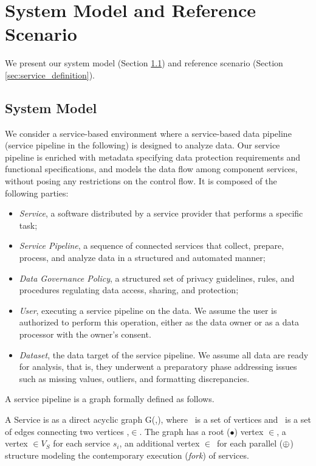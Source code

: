 \section{System Model and Reference Scenario}\label{sec:requirements}
We present our system model (Section \ref{sec:systemmodel}) and reference scenario (Section \ref{sec:service_definition}).

\subsection{System Model}\label{sec:systemmodel}
{\color{OurColor} We consider a service-based environment where a service-based data pipeline (service pipeline in the following) is designed to analyze data. Our service pipeline is enriched with metadata specifying data protection requirements and functional specifications, and models the data flow among component services, without posing any restrictions on the control flow.} It is composed of the following parties:
\begin{itemize}
  \item \emph{Service}, a software distributed by a service provider that performs a specific task;
  \item \emph{Service Pipeline}, a sequence of connected services that collect, prepare, process, and analyze data in a structured and automated manner;
  \item \emph{Data Governance Policy}, a structured set of privacy guidelines, rules, and procedures regulating data access, sharing, and protection;
  \item \emph{User}, executing a service pipeline on the data. We assume the user is authorized to perform this operation, either as the data owner or as a data processor with the owner's consent.
  \item \emph{Dataset}, the data target of the service pipeline. We assume all data are ready for analysis, that is, they underwent a preparatory phase addressing issues such as missing values, outliers, and formatting discrepancies.
\end{itemize}

\vspace{0.5em}

A service pipeline is a graph formally defined as follows.

\vspace{0.5em}

\begin{definition}\label{def:pipeline}
  A Service \pipeline is as a direct acyclic graph G(\V,\E), where \V\ is a set of vertices and \E\ is a set of edges connecting two vertices ,$\in$\V.
  The graph has a root ($\bullet$) vertex $\in$\V, a vertex $\in$$V_S$ for each service $s_i$, an additional vertex $\in$\V\ for each parallel ($\oplus$) structure modeling the contemporary execution (\emph{fork}) of services.
\end{definition}

